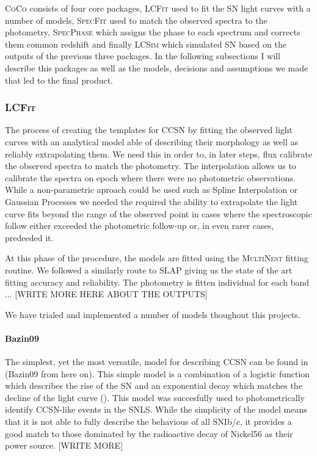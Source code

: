 \textsc{CoCo} consists of four core packages, \textsc{LCFit} used to fit the SN light curves with a number of models, \textsc{SpecFit} used to match the observed spectra to the photometry, \textsc{SpecPhase} which assigns the phase to each spectrum and corrects them common redshift and finally \textsc{LCSim} which simulated SN based on the outputs of the previous three packages. In the following subsections I will describe this packages as well as the models, decisions and assumptions we made that led to the final product.

\subsubsection{\textsc{LCFit}} \label{sec:LCFit}
The process of creating the templates for CCSN by fitting the observed light curves with an analytical model able of describing their morphology as well as reliably extrapolating them. We need this in order to, in later steps, flux calibrate the observed spectra to match the photometry. The interpolation allows us to calibrate the spectra on epoch where there were no photometric observations. While a non-parametric aproach could be used such as Spline Interpolation or Gaussian Processes we needed the required the ability to extrapolate the light curve fits beyond the range of the observed point in cases where the spectroscopic follow either exceeded the photometric follow-up or, in even rarer cases, predeeded it.

At this phase of the procedure, the models are fitted using the \textsc{MultiNest} fitting routine. We followed a similarly route to \textsc{SLAP} giving us the state of the art fitting accuracy and reliability. The photometry is fitten individual for each band ... [WRITE MORE HERE ABOUT THE OUTPUTS]

We have trialed and implemented a number of models thoughout this projects.

\paragraph{Bazin09}
The simplest, yet the most versatile, model for describing CCSN can be found in \citet{Bazin2009} (Bazin09 from here on). This simple model is a combination of a logistic function which describes the rise of the SN and an exponential decay which matches the decline of the light curve (). This model was succesfully used to photometrically identify CCSN-like events in the SNLS. While the simplicity of the model means that it is not able to fully describe the behavious of all SNIb/c, it provides a good match to those dominated by the radioactive decay of Nickel56 as their power source. [WRITE MORE]

